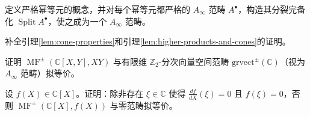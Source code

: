 \begin{exercise}\label{exer:split-completion}
定义严格幂等元的概念，并对每个幂等元都严格的 $A_\infty$ 范畴 $A^\bullet$，构造其分裂完备化 $\operatorname{Split}A^\bullet$，使之成为一个 $A_\infty$ 范畴。
\end{exercise}

\begin{exercise}\label{exer:cone-lemma-proofs}
补全引理\ref{lem:cone-properties}和引理\ref{lem:higher-products-and-cones}的证明。
\end{exercise}

\begin{exercise}\label{exer:matrix-factorization-xy}
证明 $\operatorname{MF}^{\pm}(\mathbb C[X,Y],XY)$ 与有限维 $\mathbb Z_2$-分次向量空间范畴 $\mathrm{grvect}^{\pm}(\mathbb C)$（视为 $A_\infty$ 范畴）拟等价。
\end{exercise}

\begin{exercise}\label{exer:matrix-factorization-polynomial}
设 $f(X)\in\mathbb C[X]$。证明：除非存在 $\xi\in\mathbb C$ 使得 $\frac{df}{dX}(\xi)=0$ 且 $f(\xi)=0$，否则 $\operatorname{MF}^{\pm}(\mathbb C[X],f(X))$ 与零范畴拟等价。
\end{exercise}

